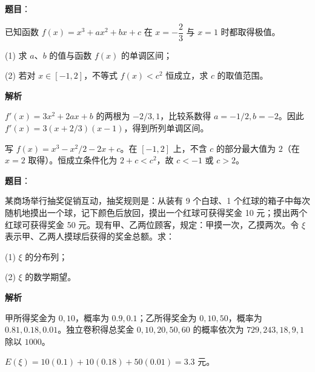 \begin{answer}

\textbf{题目}：

已知函数 $f(x)=x^3+ax^2+bx+c$ 在 $x=-\dfrac23$ 与 $x=1$ 时都取得极值。

(1) 求 $a\text{、}b$ 的值与函数 $f(x)$ 的单调区间；

(2) 若对 $x\in[-1,2]$，不等式 $f(x)<c^2$ 恒成立，求 $c$ 的取值范围。

\textbf{解析}


$f'(x)=3x^2+2ax+b$ 的两根为 $-2/3,1$，比较系数得 $a=-1/2,b=-2$。因此 $f'(x)=3(x+2/3)(x-1)$，得到所列单调区间。


写 $f(x)=x^3-x^2/2-2x+c$。在 $[-1,2]$ 上，不含 $c$ 的部分最大值为 $2$（在 $x=2$ 取得）。恒成立条件化为 $2+c<c^2$，故 $c<-1$ 或 $c>2$。



\end{answer}
\begin{answer}

\textbf{题目}：

某商场举行抽奖促销互动，抽奖规则是：从装有 9 个白球、1 个红球的箱子中每次随机地摸出一个球，记下颜色后放回，摸出一个红球可获得奖金 10 元；摸出两个红球可获得奖金 50 元。现有甲、乙两位顾客，规定：甲摸一次，乙摸两次。令 $\xi$ 表示甲、乙两人摸球后获得的奖金总额。求：

(1) $\xi$ 的分布列；

(2) $\xi$ 的数学期望。

\textbf{解析}


甲所得奖金为 $0,10$，概率为 $0.9,0.1$；乙所得奖金为 $0,10,50$，概率为 $0.81,0.18,0.01$。独立卷积得总奖金 $0,10,20,50,60$ 的概率依次为 $729,243,18,9,1$ 除以 $1000$。


$E(\xi)=10(0.1)+10(0.18)+50(0.01)=3.3$ 元。



\end{answer}
